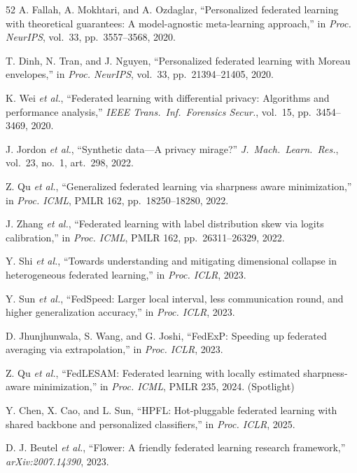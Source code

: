 \documentclass[conference,a4paper]{IEEEtran}
\begin{document}
\begin{thebibliography}{52}
A. Fallah, A. Mokhtari, and A. Ozdaglar, ``Personalized federated learning with theoretical guarantees: A model-agnostic meta-learning approach,'' in \textit{Proc. NeurIPS}, vol.~33, pp.~3557--3568, 2020.

T. Dinh, N. Tran, and J. Nguyen, ``Personalized federated learning with Moreau envelopes,'' in \textit{Proc. NeurIPS}, vol.~33, pp.~21394--21405, 2020.

K. Wei \textit{et al.}, ``Federated learning with differential privacy: Algorithms and performance analysis,'' \textit{IEEE Trans.~Inf.~Forensics Secur.}, vol.~15, pp.~3454--3469, 2020.

J. Jordon \textit{et al.}, ``Synthetic data---A privacy mirage?'' \textit{J.~Mach.~Learn.~Res.}, vol.~23, no.~1, art.~298, 2022.

Z. Qu \textit{et al.}, ``Generalized federated learning via sharpness aware minimization,'' in \textit{Proc. ICML}, PMLR 162, pp.~18250--18280, 2022.

J. Zhang \textit{et al.}, ``Federated learning with label distribution skew via logits calibration,'' in \textit{Proc. ICML}, PMLR 162, pp.~26311--26329, 2022.

Y. Shi \textit{et al.}, ``Towards understanding and mitigating dimensional collapse in heterogeneous federated learning,'' in \textit{Proc. ICLR}, 2023.

Y. Sun \textit{et al.}, ``FedSpeed: Larger local interval, less communication round, and higher generalization accuracy,'' in \textit{Proc. ICLR}, 2023.

D. Jhunjhunwala, S. Wang, and G. Joshi, ``FedExP: Speeding up federated averaging via extrapolation,'' in \textit{Proc. ICLR}, 2023.

Z. Qu \textit{et al.}, ``FedLESAM: Federated learning with locally estimated sharpness-aware minimization,'' in \textit{Proc. ICML}, PMLR 235, 2024. (Spotlight)

Y. Chen, X. Cao, and L. Sun, ``HPFL: Hot-pluggable federated learning with shared backbone and personalized classifiers,'' in \textit{Proc. ICLR}, 2025.

D. J. Beutel \textit{et al.}, ``Flower: A friendly federated learning research framework,'' \textit{arXiv:2007.14390}, 2023.


\end{thebibliography}
\end{document}
